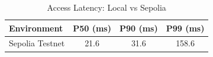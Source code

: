 \begin{table}[ht]
\centering
\caption{Access Latency: Local vs Sepolia}
\small
\begin{tabular}{lccc}
\toprule
\textbf{Environment} & \textbf{P50 (ms)} & \textbf{P90 (ms)} & \textbf{P99 (ms)} \\
\midrule
Sepolia Testnet & 21.6 & 31.6 & 158.6 \\
\bottomrule
\end{tabular}
\label{tab:e2-latency}
\end{table}
